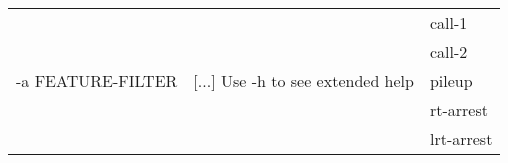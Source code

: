 {\small
\begin{tabular}{@{}p{}p{}l@{}}
\multirow{5}{=}{-a FEATURE-FILTER} & \multirow{5}{=}{[...] Use -h to see extended help} & call-1 \\
 &  & call-2 \\
 &  & pileup \\
 &  & rt-arrest \\
 &  & lrt-arrest \\
\end{tabular}\\
}
